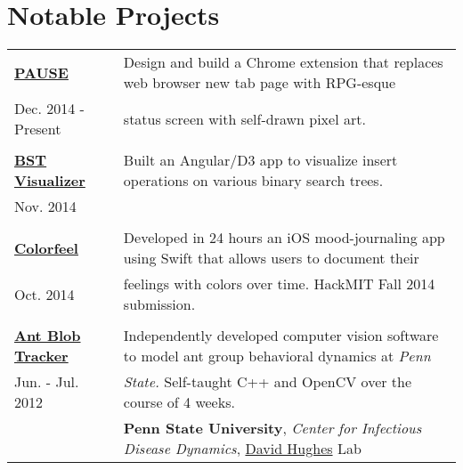 \documentclass{resume}[10pt, a4paper]
\begin{document}
\section{Notable Projects}
\begin{tabular}{l | l}    
    \textbf{\href{https://github.com/jtcho/PAUSE}{PAUSE}} & Design and build a Chrome extension that replaces web browser new tab page with RPG-esque\\
            Dec. 2014 - Present&status screen with self-drawn pixel art.\\\\
    \textbf{\href{http://bst.jtcho.me}{BST Visualizer}} & Built an Angular/D3 app to visualize insert operations on various binary search trees.\\
            Nov. 2014 & \\\\
    \textbf{\href{http://jtcho.me/colorfeel}{Colorfeel}}&Developed in 24 hours an iOS mood-journaling app using Swift that allows users to document their\\
            Oct. 2014& feelings with colors over time. HackMIT Fall 2014 submission.\\\\
    \textbf{\href{http://jtcho.me/anttracker}{Ant Blob Tracker}} & Independently developed computer vision software to model ant group behavioral dynamics at \textit{Penn}\\
            Jun. - Jul. 2012&\textit{State.} Self-taught C++ and OpenCV over the course of 4 weeks.\\
                     &\textbf{Penn State University}, \textit{Center for Infectious Disease Dynamics}, \href{http://www.hugheslab.com/}{David Hughes} Lab

\end{tabular}
\end{document}
